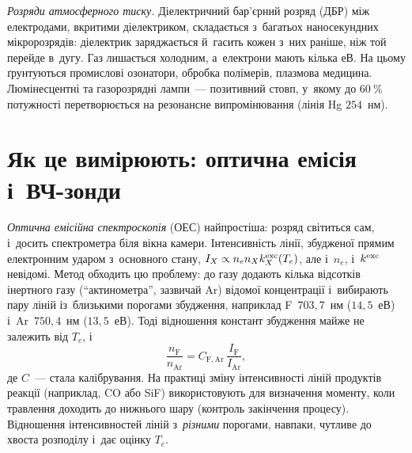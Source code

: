 \emph{Розряди атмосферного тиску.} Діелектричний бар'єрний розряд (ДБР) між електродами,
вкритими діелектриком, складається з~багатьох наносекундних мікророзрядів: діелектрик
заряджається й~гасить кожен з~них раніше, ніж той перейде в~дугу. Газ лишається холодним, а~електрони
мають кілька еВ. На цьому ґрунтуються промислові озонатори, обробка полімерів, плазмова медицина.
Люмінесцентні та газорозрядні лампи~--- позитивний стовп, у~якому до $60~\%$ потужності
перетворюється на резонансне випромінювання (лінія Hg $254$~нм).

\section{Як це вимірюють: оптична емісія і~ВЧ-зонди}\label{sec:discharge-diagnostics}

\emph{Оптична емісійна спектроскопія} (ОЕС) найпростіша: розряд світиться сам, і~досить
спектрометра біля вікна камери. Інтенсивність лінії, збудженої прямим електронним ударом з~основного стану,
$I_X\propto n_en_Xk_X^{\rm exc}(T_e)$, але і~$n_e$, і~$k^{\rm exc}$ невідомі. Метод
 обходить цю проблему: до газу додають кілька відсотків інертного газу
(\enquote{актинометра}, зазвичай Ar) відомої концентрації і~вибирають пару ліній із~близькими
порогами збудження, наприклад F~$703{,}7$~нм ($14{,}5$~еВ) і~Ar~$750{,}4$~нм ($13{,}5$~еВ). Тоді
відношення констант збудження майже не залежить від $T_e$, і
\begin{equation}\label{eq:actinometry}
	\frac{n_{\mathrm F}}{n_{\mathrm{Ar}}}=C_{\mathrm{F,Ar}}\,\frac{I_{\mathrm F}}{I_{\mathrm{Ar}}},
\end{equation}
де $C$~--- стала калібрування. На практиці зміну інтенсивності ліній продуктів реакції (наприклад,
CO або SiF) використовують для визначення моменту, коли травлення доходить до нижнього шару
(контроль закінчення процесу). Відношення інтенсивностей ліній з~\emph{різними} порогами,
навпаки, чутливе до хвоста розподілу і~дає оцінку $T_e$.

